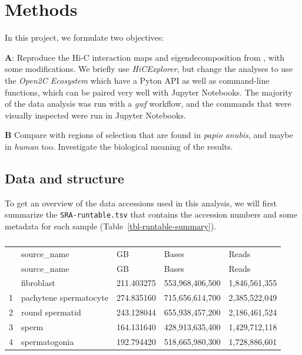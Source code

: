 \documentclass[
  a4paper,
  DIV=11,
  numbers=noendperiod]{scrartcl}
\begin{document}
\section{Methods}\label{methods}

In this project, we formulate two objectives:

\textbf{A}: Reproduce the Hi-C interaction maps and eigendecomposition
from \citep{wang_reprogramming_2019}, with some modifications. We
briefly use \emph{HiCExplorer}, but change the analyses to use the
\emph{Open2C Ecosystem} \citep{open2c} which have a Pyton API as well as
command-line functions, which can be paired very well with Jupyter
Notebooks. The majority of the data analysis was run with a \emph{gwf}
workflow, and the commands that were visually inspected were run in
Jupyter Notebooks.

\textbf{B} Compare with regions of selection that are found in
\emph{papio anubis}, and maybe in \emph{human} too. Investigate the
biological meaning of the results.

\subsection{Data and structure}\label{data-and-structure}

\label{md-data-accessions}
To get an overview of the data accessions used in this analysis, we will
first summarize the \texttt{SRA-runtable.tsv} that contains the
accession numbers and some metadata for each sample
(Table~\ref{tbl-runtable-summary}).

\begin{longtable}[]{@{}lllll@{}}

\caption{\label{tbl-runtable-summary}Summary of the data accessions used
in this analysis}

\tabularnewline

\caption{}\label{T_0aa9c}\tabularnewline
\toprule\noalign{}
~ & source\_name & GB & Bases & Reads \\
\midrule\noalign{}
\endfirsthead
\toprule\noalign{}
~ & source\_name & GB & Bases & Reads \\
\midrule\noalign{}
\endhead
\bottomrule\noalign{}
\endlastfoot
0 & fibroblast & 211.403275 & 553,968,406,500 & 1,846,561,355 \\
1 & pachytene spermatocyte & 274.835160 & 715,656,614,700 &
2,385,522,049 \\
2 & round spermatid & 243.128044 & 655,938,457,200 & 2,186,461,524 \\
3 & sperm & 164.131640 & 428,913,635,400 & 1,429,712,118 \\
4 & spermatogonia & 192.794420 & 518,665,980,300 & 1,728,886,601 \\

\end{longtable}
\end{document}
